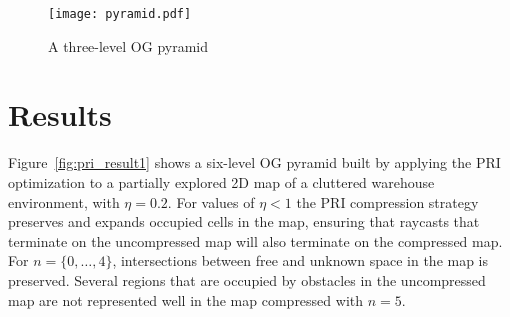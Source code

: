 \begin{figure}
  \centering
  \texttt{[image: pyramid.pdf]}
  \caption[Diagram of a three-level OG pyramid.]{A three-level OG pyramid\label{fig:og_pyramid}}
\end{figure}

\section{Results}
\label{sec:chapter3_results}

Figure~\ref{fig:pri_result1} shows a six-level OG pyramid built by applying the PRI
optimization to a partially explored 2D map of a cluttered warehouse environment,
with $\eta = 0.2$. For values of
$\eta < 1$ the PRI compression strategy preserves and expands occupied cells in
the map, ensuring that raycasts that terminate on the uncompressed map will also
terminate on the compressed map. For $n=\{0,\dots,4\}$, intersections between
free and unknown space in the map is preserved. Several regions that are
occupied by obstacles in the uncompressed map are not represented well in
the map compressed with $n=5$.

